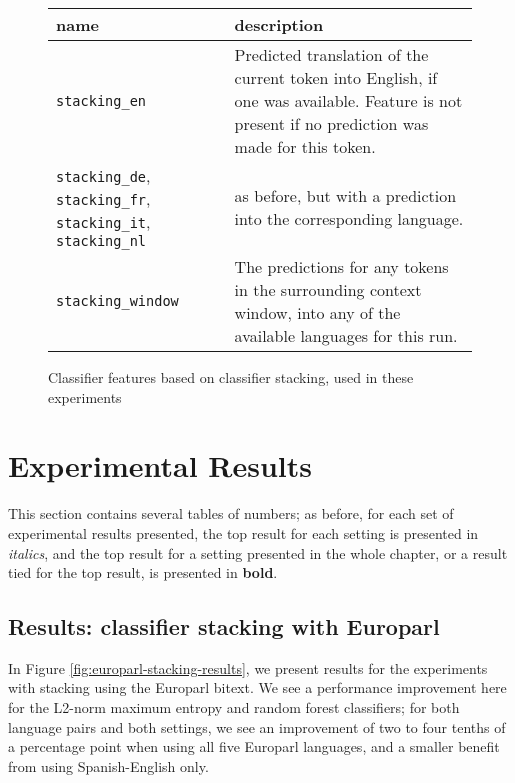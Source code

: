 \begin{figure*}
  \begin{centering}
  \begin{tabular}{|p{3.5cm}|p{11cm}|}
    \hline
    name          & description  \\
    \hline
    \texttt{stacking\_en} & Predicted translation of the current token into
    English, if one was available. Feature is not present if no prediction was
    made for this token. \\
    \hline
    \texttt{stacking\_de}, \texttt{stacking\_fr}, \texttt{stacking\_it},
    \texttt{stacking\_nl} & as before, but with a prediction into the
    corresponding language.\\
    \hline
    \texttt{stacking\_window} & The predictions for any tokens in the
    surrounding context window, into any of the available languages for this
    run. \\
    \hline
  \end{tabular}
  \end{centering}
  \caption{Classifier features based on classifier stacking, used in these
  experiments}
  \label{fig:stackingfeatures}
\end{figure*}

\section{Experimental Results}
\label{sec:multilingual-results}

This section contains several tables of numbers; as before, for each set of
experimental results presented, the top result for each setting is presented in
\emph{italics}, and the top result for a setting presented in the whole
chapter, or a result tied for the top result, is presented in \textbf{bold}.

\subsection{Results: classifier stacking with Europarl}

In Figure \ref{fig:europarl-stacking-results}, we present results for the
experiments with stacking using the Europarl bitext. We see a performance
improvement here for the L2-norm maximum entropy and random forest classifiers;
for both language pairs and both settings, we see an improvement of two to four
tenths of a percentage point when using all five Europarl languages, and a
smaller benefit from using Spanish-English only.

